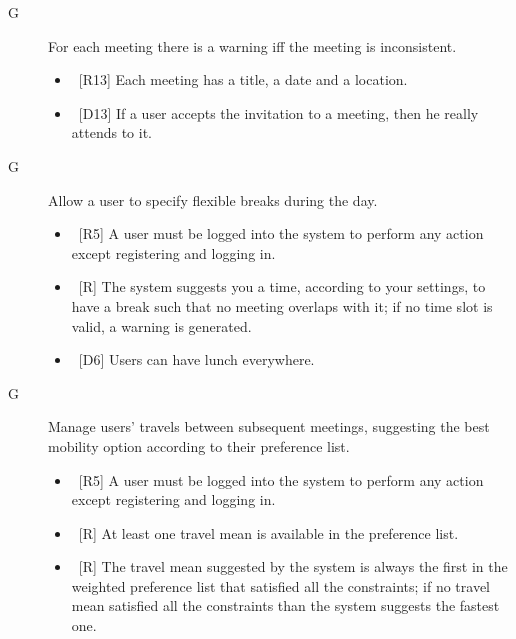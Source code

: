 \begin{description}
\item[G\thecountGoal]For each meeting there is a warning iff the meeting is inconsistent.

\begin{itemize}
\item~[R13] Each meeting has a title, a date and a location.
\end{itemize}

\begin{itemize}
\item~[D13] If a user accepts the invitation to a meeting, then he really attends to it.
\end{itemize}

\item[G\thecountGoal] Allow a user to specify flexible breaks during the day.

\begin{itemize}
\item~[R5] A user must be logged into the system to perform any action except registering and logging in.
\item~[R\reqNum] The system suggests you a time, according to your settings, to have a break such that no meeting overlaps with it; if no time slot is valid, a warning is generated.
\end{itemize}

\begin{itemize}
\item~[D6] Users can have lunch everywhere.
\end{itemize}

\item[G\thecountGoal] Manage users’ travels between subsequent meetings, suggesting the best mobility option according to their preference list.

\begin{itemize}
\item~[R5] A user must be logged into the system to perform any action except registering and logging in.
\item~[R\reqNum] At least one travel mean is available in the preference list.
\item~[R\reqNum] The travel mean suggested by the system is always the first in the weighted preference list that satisfied all the constraints; if no travel mean satisfied all the constraints than the system suggests the fastest one.
\end{itemize}


\end{description}
